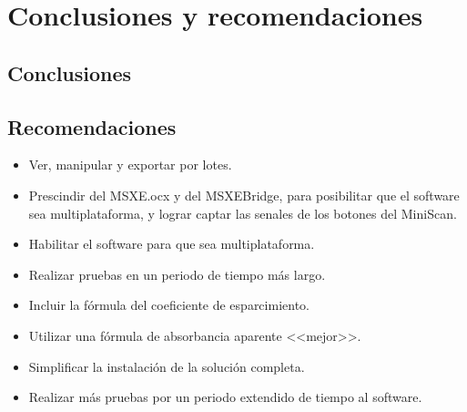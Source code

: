 \chapter{Conclusiones y recomendaciones}

\capV

\section{Conclusiones}

\section{Recomendaciones}

\begin{itemize}

	\item Ver, manipular y exportar por lotes.
	
	\item Prescindir del MSXE.ocx y del MSXEBridge, para posibilitar que el software sea multiplataforma, y lograr captar las senales de los botones del MiniScan.
	
	\item Habilitar el software para que sea multiplataforma.
	
	\item Realizar pruebas en un periodo de tiempo m\'{a}s largo.
	
	\item Incluir la f\'{o}rmula del coeficiente de esparcimiento.
	
	\item Utilizar una f\'{o}rmula de absorbancia aparente <<mejor>>.
	
	\item Simplificar la instalaci\'{o}n de la soluci\'{o}n completa.
	
	\item Realizar m\'{a}s pruebas por un periodo extendido de tiempo al software.
\end{itemize}
